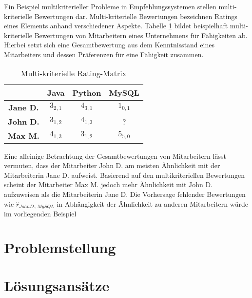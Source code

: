 
Ein Beispiel multikriterieller Probleme in Empfehlungssystemen stellen multi-kriterielle Bewertungen dar.
Multi-kriterielle Bewertungen bezeichnen Ratings eines Elements anhand verschiedener Aspekte.
Tabelle \ref{tab3} bildet beispielhaft multi-kriterielle Bewertungen von Mitarbeitern eines Unternehmens für Fähigkeiten ab.
Hierbei setzt sich eine Gesamtbewertung aus dem Kenntnisstand eines Mitarbeiters und dessen Präferenzen für eine Fähigkeit zusammen.

\begin{table}[htbp]
    \begin{center}
    \begin{tabular}{|c||c|c|c|}
    \hline
    {} & {\textbf{Java}} & {\textbf{Python}} & {\textbf{MySQL}}\\
    \hline
    \hline
    \textbf{Jane D.} & $3_{2,1}$ & $4_{3,1}$ & $1_{0,1}$ \\
    \hline
    \textbf{John D.} & $3_{1,2}$ & $4_{1,3}$ & ? \\
    \hline
    \textbf{Max M.} & $4_{1,3}$ & $3_{1,2}$ & $5_{5,0}$ \\
    \hline
    \end{tabular}
    \end{center}
    \caption[Multi-kriterielle Rating-Matrix ]{Multi-kriterielle Rating-Matrix \\}
	\label{tab3}
\end{table}

Eine alleinige Betrachtung der Gesamtbewertungen von Mitarbeitern lässt vermuten, dass der Mitarbeiter John D. am meisten Ähnlichkeit mit der Mitarbeiterin Jane D. aufweist.
Basierend auf den multikriteriellen Bewertungen scheint der Mitarbeiter Max M. jedoch mehr Ähnlichkeit mit John D. aufzuweisen als die Mitarbeiterin Jane D.
Die Vorhersage fehlender Bewertungen wie $\hat{r}_{John D., MySQL}$ in Abhängigkeit der Ähnlichkeit zu anderen Mitarbeitern würde im vorliegenden Beispiel

\section{Problemstellung}

\section{Lösungsansätze}

